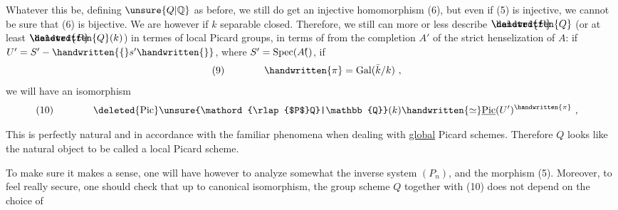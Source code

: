 Whatever this be, defining $\unsure{Q|\mathbb{Q}}$ as before, we still do get an injective homomorphism (6), but even if (5) is injective, we cannot be sure that (6) is bijective. We are however if $k$  separable closed. Therefore, we still  can more or less describe $\mathord{\rlap{$\deleted{P}$}\handwritten{Q}}$ (or at least $\mathord{\rlap{$\deleted{P}$}\handwritten{Q}}(k)$) in termes of local Picard groups, in terms of  from the completion $A'$ of the strict henselization of $A$: if $U'=S'-\handwritten{\{}s'\handwritten{\}}$, where $S'=\operatorname{Spec}(A\mathord{\rlap{${}'$}(})$,  if
\[
\begin{aligned}
(9)\qquad\qquad & \handwritten{\pi}=\operatorname{Gal}(\bar{k}/k)\ ,
\end{aligned}
\]
we will have an isomorphism
\[
\begin{aligned}
(10)\qquad\qquad & \deleted{\operatorname{Pic}}\unsure{\mathord{\rlap{$P$}Q}|\mathbb{Q}}(k)\handwritten{\simeq}\underline{\operatorname{Pic}}(U')^{\handwritten{\pi}}\ ,
\end{aligned}
\]

This is perfectly natural and in accordance with the familiar phenomena when dealing with \uline{global} Picard schemes. Therefore $Q$ looks like the natural object to be called a  local Picard scheme.

To make sure it makes a sense, one will have however to analyze somewhat the inverse system $(P_n)$, and the morphism (5). Moreover, to feel really secure, one should check that up to canonical isomorphism, the group scheme $Q$ together with (10) does not depend on the choice of

